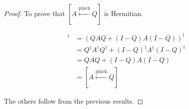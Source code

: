 \documentclass[12pt]{article}
\theoremstyle{plain}
\begin{document}
\begin{proof}
To prove that $[A \overset{\text{pinch}}{\gets} Q]$ is Hermitian.

\begin{align*}
    [A \overset{\text{pinch}}{\gets} Q]^\dagger &=  \left(Q A Q + (I-Q) A (I - Q)\right)^\dagger \\
    &= Q^\dagger A^\dagger Q^\dagger + (I - Q)^\dagger A^\dagger (I-Q)^\dagger\\
    &= Q A Q + (I-Q) A (I - Q)\\
    &= [A \overset{\text{pinch}}{\gets} Q]
\end{align*}

\noindent The others follow from the previous results.




    
\end{proof}
\end{document}
